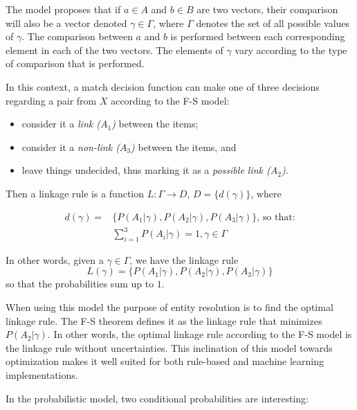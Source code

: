 \documentclass[journal]{IEEEtran}
\begin{document}
    The model proposes that if $a \in A$ and $b \in B$ are two vectors, their
    comparison will also be a vector denoted $\gamma \in \varGamma$, where
    $\varGamma$ denotes the set of all possible values of $\gamma$.
    The comparison between $a$ and $b$ is performed between each corresponding
    element in each of the two vectors.
    The elements of $\gamma$ vary according to the type of comparison that is
    performed\cite{winkler1990}.

    In this context, a match decision function can make one of three decisions
    regarding a pair from $X$ according to the F-S model:
    
    \begin{itemize}
        \item consider it a \textit{link ($A_1$)} between the items;
        \item consider it a \textit{non-link ($A_3$)} between the items, and
        \item leave things undecided, thus marking it as a \textit{possible link
              ($A_2$)}.
    \end{itemize}
    
    Then a linkage rule is a function $L:\varGamma \rightarrow D$,
    $D=\{d(\gamma)\}$, where
    
    \begin{align}
        d(\gamma) = &\{P(A_1|\gamma),P(A_2|\gamma),P(A_3|\gamma)\}\textrm{, so
        that:}\nonumber\\
        &\sum_{i=1}^{3}P(A_i|\gamma) = 1\nonumber, \gamma \in \varGamma\nonumber
    \end{align}

    In other words, given a $\gamma \in \varGamma$, we have the linkage rule
    \[
        L(\gamma) = \{P(A_1|\gamma), P(A_2|\gamma), P(A_3|\gamma)\}
    \]
    so that the probabilities sum up to $1$.

    When using this model the purpose of entity resolution is to find the
    optimal linkage rule.
    The F-S theorem defines it as the linkage rule that minimizes
    $P(A_2|\gamma)$.
    In other words, the optimal linkage rule according to the F-S model is the
    linkage rule without uncertainties.
    This inclination of this model towards optimization makes it well suited for
    both rule-based\cite{oyster2012} and machine learning\cite{deepm2020}
    implementations.
    
    In the probabilistic model, two conditional probabilities are interesting:
\end{document}

